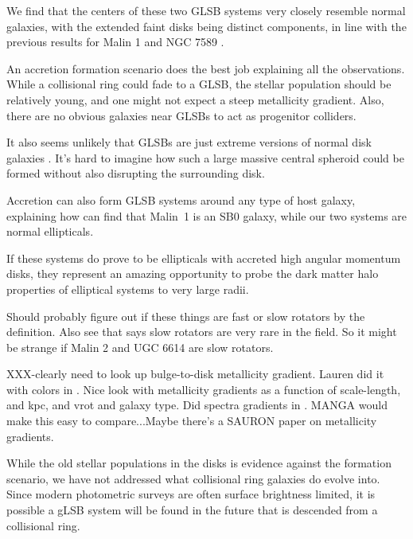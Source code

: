 \documentclass{emulateapj}
\begin{document}
We find that the centers of these two GLSB systems very closely resemble normal galaxies, with the extended faint disks being distinct components, in line with the previous results for Malin 1 \citep{Barth07} and NGC 7589 \citep{Lelli10}. 

An accretion formation scenario does the best job explaining all the observations.  While a collisional ring could fade to a GLSB, the stellar population should be relatively young, and one might not expect a steep metallicity gradient.  Also, there are no obvious galaxies near GLSBs to act as progenitor colliders.  

It also seems unlikely that GLSBs are just extreme versions of normal disk galaxies \citep{Das13}.  It's hard to imagine how such a large massive central spheroid could be formed without also disrupting the surrounding disk.

Accretion can also form GLSB systems around any type of host galaxy, explaining how \citet{Barth07} can find that Malin~1 is an SB0 galaxy, while our two systems are normal ellipticals.


If these systems do prove to be ellipticals with accreted high angular momentum disks, they represent an amazing opportunity to probe the dark matter halo properties of elliptical systems to very large radii.

Should probably figure out if these things are fast or slow rotators by the \citet{Emsell11} definition.  Also see \citet{Capp11} that says slow rotators are very rare in the field.  So it might be strange if Malin 2 and UGC 6614 are slow rotators. 

XXX-clearly need to look up bulge-to-disk metallicity gradient.  Lauren did it with colors in \citet{MacArthur04}.  Nice look with metallicity gradients as a function of scale-length, and kpc, and vrot and galaxy type.  Did spectra gradients in \citet{MacArthur09}.  MANGA would make this easy to compare...Maybe there's a SAURON paper on metallicity gradients.


While the old stellar populations in the disks is evidence against the \citet{Mapelli08} formation scenario, we have not addressed what collisional ring galaxies do evolve into.  Since modern photometric surveys are often surface brightness limited, it is possible a gLSB system will be found in the future that is descended from a collisional ring.  
\end{document}
